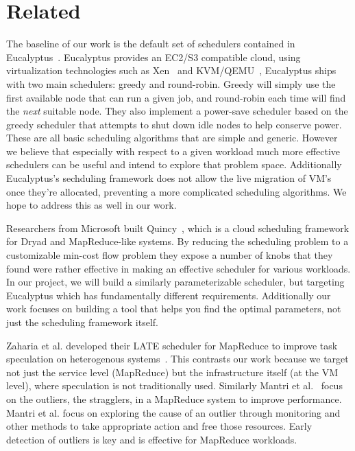 \section{Related}



The baseline of our work is the default set of schedulers contained in
Eucalyptus~\cite{Eucalyptus}.  Eucalyptus provides an EC2/S3 %
compatible cloud, using virtualization technologies such as Xen~\cite{Xen} and
KVM/QEMU~\cite{QEMU}, Eucalyptus ships with two main schedulers: greedy and
round-robin.  Greedy will simply use the first available node that can run a
given job, and round-robin each time will find the \emph{next} suitable node.
They also implement a power-save scheduler based on the greedy scheduler that
attempts to shut down idle nodes to help conserve power.  These are all basic
scheduling algorithms that are simple and generic.  However we believe that
especially with respect to a given workload much more effective schedulers can
be useful and intend to explore that problem space.  Additionally Eucalyptus's
sechduling framework does not allow the live migration of VM's once they're
allocated, preventing a more complicated scheduling algorithms.  We hope to
address this as well in our work.

Researchers from Microsoft built Quincy~\cite{Quincy}, which is a cloud
scheduling framework for Dryad and MapReduce-like systems.  By reducing the
scheduling problem to a customizable min-cost flow problem they expose a number
of knobs that they found were rather effective in making an effective scheduler
for various workloads.  In our project, we will build a similarly
parameterizable scheduler, but targeting Eucalyptus which has fundamentally
different requirements.  Additionally our work focuses on building a tool that
helps you find the optimal parameters, not just the scheduling framework itself.

Zaharia et al. developed their LATE scheduler for MapReduce to improve task
speculation on heterogenous systems~\cite{Zaharia}.  This contrasts our work
because we target not just the service level (MapReduce) but the infrastructure
itself (at the VM level), where speculation is not traditionally used.
Similarly Mantri et al.~\cite{Mantri} focus on the outliers, the stragglers, in
a MapReduce system to improve performance.  Mantri et al. focus on exploring the
cause of an outlier through monitoring and other methods to take appropriate
action and free those resources.  Early detection of outliers is key and is
effective for MapReduce workloads.

